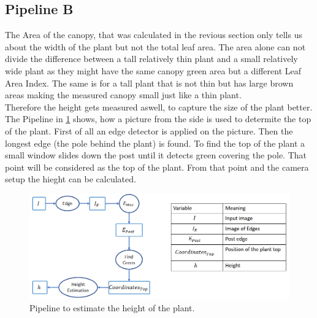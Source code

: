 \subsection{Pipeline B}

The Area of the canopy, that was calculated in the revious section only tells us about the width of the plant but not the total leaf area. The area alone can not divide the difference between a tall relatively thin plant and a small relatively wide plant as they might have the same canopy green area but a different Leaf Area Index. The same is for a tall plant that is not thin but has large brown areas making the measured canopy small just like a thin plant.\\
Therefore the height gets measured aswell, to capture the size of the plant better. The Pipeline in \ref{fig:pipelineB} shows, how a picture from the side is used to determite the top of the plant. First of all an edge detector is applied on the picture. Then the longest edge (the pole behind the plant) is found. To find the top of the plant a small window slides down the post until it detects green covering the pole. That point will be considered as the top of the plant. From that point and the camera setup the hieght can be calculated. 
   \begin{figure}[H]
       \centering
       \includegraphics[scale=0.6]{pipelineB.PNG}
       \caption{Pipeline to estimate the height of the plant.}
       \label{fig:pipelineB}
   \end{figure}
